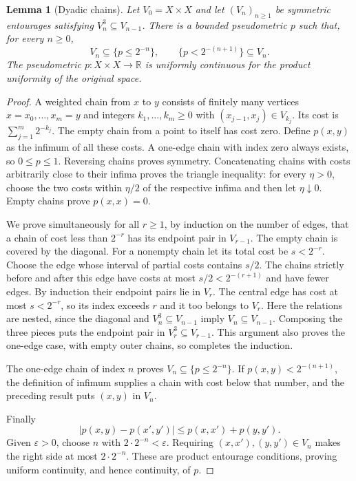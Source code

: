 \documentclass[11pt,oneside,openany]{book}
\newtheorem{lemma}[theorem]{Lemma}
\theoremstyle{definition}
\theoremstyle{remark}
\newcommand{\R}{\mathbb R}\newcommand{\C}{\mathbb C}
\newcommand{\eps}{\varepsilon}
\begin{document}
\begin{lemma}[Dyadic chains]\label{d10:12:dyadic-chains}
Let $V_0=X\times X$ and let $(V_n)_{n\geq1}$ be symmetric entourages satisfying $V_n^3\subseteq V_{n-1}$. There is a bounded pseudometric $p$ such that, for every $n\geq0$,
\[
 V_n\subseteq\{p\leq2^{-n}\},\qquad
 \{p<2^{-(n+1)}\}\subseteq V_n.
\]
The pseudometric $p:X\times X\to\R$ is uniformly continuous for the product uniformity of the original space.
\end{lemma}
\begin{proof}
A weighted chain from $x$ to $y$ consists of finitely many vertices $x=x_0,\ldots,x_m=y$ and integers $k_1,\ldots,k_m\geq0$ with $(x_{j-1},x_j)\in V_{k_j}$. Its cost is $\sum_{j=1}^m2^{-k_j}$. The empty chain from a point to itself has cost zero. Define $p(x,y)$ as the infimum of all these costs. A one-edge chain with index zero always exists, so $0\leq p\leq1$. Reversing chains proves symmetry. Concatenating chains with costs arbitrarily close to their infima proves the triangle inequality: for every $\eta>0$, choose the two costs within $\eta/2$ of the respective infima and then let $\eta\downarrow0$. Empty chains prove $p(x,x)=0$.

We prove simultaneously for all $r\geq1$, by induction on the number of edges, that a chain of cost less than $2^{-r}$ has its endpoint pair in $V_{r-1}$. The empty chain is covered by the diagonal. For a nonempty chain let its total cost be $s<2^{-r}$. Choose the edge whose interval of partial costs contains $s/2$. The chains strictly before and after this edge have costs at most $s/2<2^{-(r+1)}$ and have fewer edges. By induction their endpoint pairs lie in $V_r$. The central edge has cost at most $s<2^{-r}$, so its index exceeds $r$ and it too belongs to $V_r$. Here the relations are nested, since the diagonal and $V_n^3\subseteq V_{n-1}$ imply $V_n\subseteq V_{n-1}$. Composing the three pieces puts the endpoint pair in $V_r^3\subseteq V_{r-1}$. This argument also proves the one-edge case, with empty outer chains, so completes the induction.

The one-edge chain of index $n$ proves $V_n\subseteq\{p\leq2^{-n}\}$. If $p(x,y)<2^{-(n+1)}$, the definition of infimum supplies a chain with cost below that number, and the preceding result puts $(x,y)$ in $V_n$.

Finally
\[
 |p(x,y)-p(x',y')|\leq p(x,x')+p(y,y').
\]
Given $\eps>0$, choose $n$ with $2\cdot2^{-n}<\eps$. Requiring $(x,x'),(y,y')\in V_n$ makes the right side at most $2\cdot2^{-n}$. These are product entourage conditions, proving uniform continuity, and hence continuity, of $p$.
\end{proof}
\end{document}
